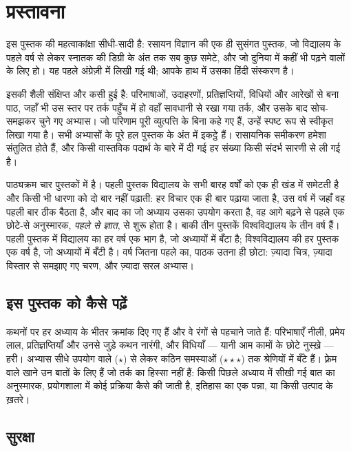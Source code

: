 \chapter{प्रस्तावना}

इस पुस्तक की महत्वाकांक्षा सीधी-सादी है: रसायन विज्ञान की एक ही सुसंगत
पुस्तक, जो विद्यालय के पहले वर्ष से लेकर स्नातक की डिग्री के अंत तक सब कुछ
समेटे, और जो दुनिया में कहीं भी पढ़ने वालों के लिए हो। यह पहले अंग्रेज़ी में
लिखी गई थी; आपके हाथ में उसका हिंदी संस्करण है।

इसकी शैली संक्षिप्त और कसी हुई है: परिभाषाओं, उदाहरणों, प्रतिज्ञप्तियों,
विधियों और आरेखों से बना पाठ, जहाँ भी उस स्तर पर तर्क पहुँच में हो वहाँ सावधानी
से रखा गया तर्क, और उसके बाद सोच-समझकर चुने गए अभ्यास। जो परिणाम पूरी
व्युत्पत्ति के बिना कहे गए हैं, उन्हें स्पष्ट रूप से स्वीकृत लिखा गया है। सभी
अभ्यासों के पूरे हल पुस्तक के अंत में इकट्ठे हैं। रासायनिक समीकरण हमेशा
संतुलित होते हैं, और किसी वास्तविक पदार्थ के बारे में दी गई हर संख्या किसी
संदर्भ सारणी से ली गई है।

पाठ्यक्रम चार पुस्तकों में है। पहली पुस्तक विद्यालय के सभी बारह वर्षों को एक ही
खंड में समेटती है और किसी भी धारणा को दो बार नहीं पढ़ाती: हर विचार एक ही बार
पढ़ाया जाता है, उस वर्ष में जहाँ वह पहली बार ठीक बैठता है, और बाद का जो अध्याय
उसका उपयोग करता है, वह आगे बढ़ने से पहले एक छोटे-से अनुस्मारक,
\emph{पहले से ज्ञात}, से शुरू होता है। बाकी तीन पुस्तकें विश्वविद्यालय के तीन
वर्ष हैं। पहली पुस्तक में विद्यालय का हर वर्ष एक भाग है, जो अध्यायों में बँटा
है; विश्वविद्यालय की हर पुस्तक एक वर्ष है, जो अध्यायों में बँटी है। वर्ष जितना
पहले का, पाठक उतना ही छोटा: ज़्यादा चित्र, ज़्यादा विस्तार से समझाए गए चरण,
और ज़्यादा सरल अभ्यास।

\section*{इस पुस्तक को कैसे पढ़ें}

कथनों पर हर अध्याय के भीतर क्रमांक दिए गए हैं और वे रंगों से पहचाने जाते हैं:
परिभाषाएँ नीली, प्रमेय लाल, प्रतिज्ञप्तियाँ और उनसे जुड़े कथन नारंगी, और
विधियाँ --- यानी आम कामों के छोटे नुस्ख़े --- हरी। अभ्यास सीधे उपयोग वाले
($\star$) से लेकर कठिन समस्याओं ($\star\star\star$) तक श्रेणियों में बँटे हैं।
फ़्रेम वाले खाने उन बातों के लिए हैं जो तर्क का हिस्सा नहीं हैं: किसी पिछले
अध्याय में सीखी गई बात का अनुस्मारक, प्रयोगशाला में कोई प्रक्रिया कैसे की जाती
है, इतिहास का एक पन्ना, या किसी उत्पाद के ख़तरे।

\section*{सुरक्षा}

